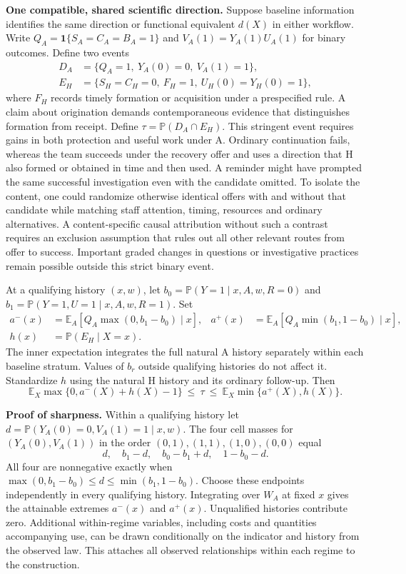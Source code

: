 \documentclass[11pt,a4paper]{article}
\newcommand{\lead}[1]{\textbf{#1}\enspace}
\newcommand{\E}{\mathbb{E}}
\newcommand{\Prob}{\mathbb{P}}
\newcommand{\ind}{\mathbf{1}}
\begin{document}
\lead{One compatible, shared scientific direction.} Suppose baseline information identifies the same direction or functional equivalent $d(X)$ in either workflow. Write $Q_A=\ind\{S_A=C_A=B_A=1\}$ and $V_A(1)=Y_A(1)U_A(1)$ for binary outcomes. Define two events
\begin{align}
 D_A &=\{Q_A=1,\ Y_A(0)=0,\ V_A(1)=1\},\\
 E_H &=\{S_H=C_H=0,\ F_H=1,\ U_H(0)=Y_H(0)=1\},
\end{align}
where $F_H$ records timely formation or acquisition under a prespecified rule. A claim about origination demands contemporaneous evidence that distinguishes formation from receipt. Define $\tau=\Prob(D_A\cap E_H)$. This stringent event requires gains in both protection and useful work under A. Ordinary continuation fails, whereas the team succeeds under the recovery offer and uses a direction that H also formed or obtained in time and then used. A reminder might have prompted the same successful investigation even with the candidate omitted. To isolate the content, one could randomize otherwise identical offers with and without that candidate while matching staff attention, timing, resources and ordinary alternatives. A content-specific causal attribution without such a contrast requires an exclusion assumption that rules out all other relevant routes from offer to success. Important graded changes in questions or investigative practices remain possible outside this strict binary event.

At a qualifying history $(x,w)$, let $b_0=\Prob(Y=1\mid x,A,w,R=0)$ and $b_1=\Prob(Y=1,U=1\mid x,A,w,R=1)$. Set
\begin{align}
 a^-(x)&=\E_A\left[Q_A\max(0,b_1-b_0)\mid x\right],&
 a^+(x)&=\E_A\left[Q_A\min(b_1,1-b_0)\mid x\right],\\
 h(x)&=\Prob(E_H\mid X=x).
\end{align}
The inner expectation integrates the full natural A history separately within each baseline stratum. Values of $b_r$ outside qualifying histories do not affect it. Standardize $h$ using the natural H history and its ordinary follow-up. Then
\begin{equation}
 \E_X\max\{0,a^-(X)+h(X)-1\}\ \le\ \tau\ \le\ \E_X\min\{a^+(X),h(X)\}.\label{eq:bounds}
\end{equation}

\lead{Proof of sharpness.} Within a qualifying history let $d=\Prob(Y_A(0)=0,V_A(1)=1\mid x,w)$. The four cell masses for $(Y_A(0),V_A(1))$ in the order $(0,1),(1,1),(1,0),(0,0)$ equal
\[
 d,\quad b_1-d,\quad b_0-b_1+d,\quad 1-b_0-d .
\]
All four are nonnegative exactly when $\max(0,b_1-b_0)\le d\le\min(b_1,1-b_0)$. Choose these endpoints independently in every qualifying history. Integrating over $W_A$ at fixed $x$ gives the attainable extremes $a^-(x)$ and $a^+(x)$. Unqualified histories contribute zero. Additional within-regime variables, including costs and quantities accompanying use, can be drawn conditionally on the indicator and history from the observed law. This attaches all observed relationships within each regime to the construction.
\end{document}
